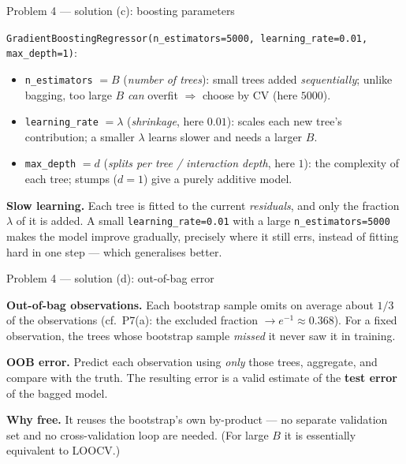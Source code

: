 \documentclass[aspectratio=169,11pt]{beamer}
\begin{document}
\begin{frame}{Problem 4 --- solution (c): boosting parameters}
  \begin{solutionbox}
    \texttt{GradientBoostingRegressor(n\_estimators=5000, learning\_rate=0.01, max\_depth=1)}:
    \begin{itemize}
      \item \texttt{n\_estimators} $=B$ (\emph{number of trees}): small trees added
        \emph{sequentially}; unlike bagging, too large $B$ \emph{can} overfit $\Rightarrow$ choose
        by CV (here $5000$).
      \item \texttt{learning\_rate} $=\lambda$ (\emph{shrinkage}, here $0.01$): scales each new
        tree's contribution; a smaller $\lambda$ learns slower and needs a larger $B$.
      \item \texttt{max\_depth} $=d$ (\emph{splits per tree / interaction depth}, here $1$): the
        complexity of each tree; stumps ($d=1$) give a purely additive model.
    \end{itemize}
    \textbf{Slow learning.} Each tree is fitted to the current \emph{residuals}, and only the
    fraction $\lambda$ of it is added. A small \texttt{learning\_rate=0.01} with a large
    \texttt{n\_estimators=5000} makes the model improve gradually, precisely where it still errs,
    instead of fitting hard in one step --- which generalises better.
  \end{solutionbox}
\end{frame}

\begin{frame}{Problem 4 --- solution (d): out-of-bag error}
  \begin{solutionbox}
    \textbf{Out-of-bag observations.} Each bootstrap sample omits on average about $1/3$ of the
    observations (cf.\ P7(a): the excluded fraction $\to e^{-1}\approx0.368$). For a fixed
    observation, the trees whose bootstrap sample \emph{missed} it never saw it in training.
    \medskip

    \textbf{OOB error.} Predict each observation using \emph{only} those trees, aggregate, and
    compare with the truth. The resulting error is a valid estimate of the \textbf{test error} of
    the bagged model.
    \medskip

    \textbf{Why free.} It reuses the bootstrap's own by-product --- no separate validation set and
    no cross-validation loop are needed. (For large $B$ it is essentially equivalent to LOOCV.)
  \end{solutionbox}
\end{frame}
\end{document}
